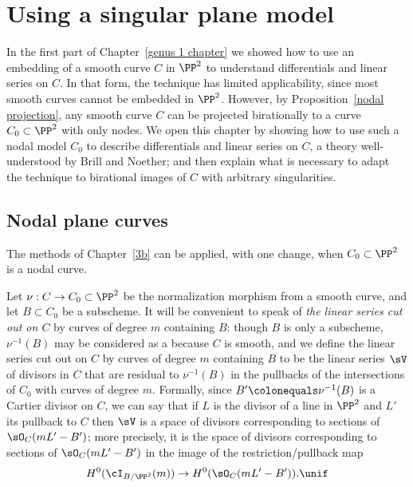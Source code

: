 

\def\adj{{\mathfrak F}}
\chapter{Using a singular plane model}
\label{PlaneCurvesChapter}
\label{PlaneCurveChapter}


In the first part of Chapter~\ref{genus 1 chapter} we showed how to
use an embedding of a smooth curve $C$ 
in $\PP^2$ to understand differentials and linear series on $C$. 
In that form,
the technique 
has limited applicability,
since most smooth curves cannot be embedded in
$\PP^2$.
However, by Proposition~\ref{nodal projection},
 any smooth curve $C$ can be projected 
birationally to a curve $C_0\subset\PP^2$ with only nodes. 
We open this chapter by showing
how to use such a nodal model $C_0$ to describe differentials and
linear series on $C$, a theory well-understood 
by Brill and Noether;  and then explain
what is necessary to adapt the technique to birational images of $C$
with arbitrary singularities. 

\section{Nodal plane curves}\label{nodal curves section}

The methods of Chapter~\ref{3b}
 can be applied, with one change, when $C_{0}\subset \PP^{2}$
%
is a nodal curve. 

Let $\nu: C\to C_{0}\subset \PP^{2}$ be the 
%
normalization morphism from a smooth curve,
and let $B\subset C_{0}$ be a subscheme.
It will be convenient to speak of 
%
\emph{the linear series cut out on $C$} by curves of degree $m$
containing $B$: though $B$ is only a subscheme, $\nu^{-1}(B)$ may be
considered as a 
%
 because
$C$ is smooth, and we define
the linear series cut out on $C$ by curves of degree $m$
containing $B$ to be
the linear series  $\sV$ of divisors in $C$ that are residual to $\nu^{-1}(B)$ in the pullbacks 
of the intersections of $C_{0}$ with curves of degree $m$. 
Formally, since $B' \colonequals  \nu^{-1}(B)$
is a Cartier divisor on $C$, we can say that if $L$ is the divisor of a line in $\PP^{2}$ and $L'$
its pullback to $C$ then
$\sV$ is a space of divisors corresponding to
sections of $\sO_{C}(mL'-B')$; more precisely, it is the space of divisors corresponding to
sections of $\sO_{C}(mL'-B')$ in the image of the restriction/pullback map
$$
H^0(\cI_{B/\PP^2}(m)) \to H^0(\sO_{C}(mL'-B')).
\unif
$$

